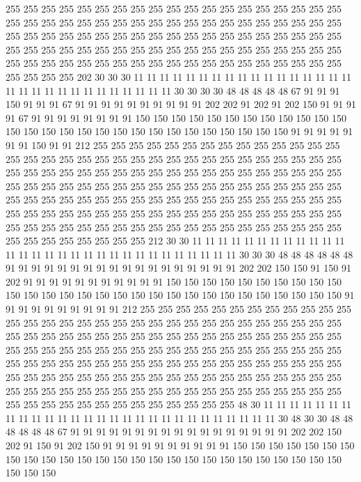 255 255 255 255 255 255 255 255 255 255 255 255 255 255 255 255 255 255 255 255
255 255 255 255 255 255 255 255 255 255 255 255 255 255 255 255 255 255 255 255
255 255 255 255 255 255 255 255 255 255 255 255 255 255 255 255 255 255 255 255
255 255 255 255 255 255 255 255 255 255 255 255 255 255 255 255 255 255 255 255
255 255 255 255 255 255 255 255 255 255 255 255 255 255 255 255 255 255 255 202
30 30 30 11 11 11 11 11 11 11 11 11 11 11 11 11 11 11 11 11
11 11 11 11 11 11 11 11 11 11 11 11 11 30 30 30 30 48 48 48
48 48 67 91 91 91 150 91 91 91 67 91 91 91 91 91 91 91 91 91
91 202 202 91 202 91 202 150 91 91 91 91 67 91 91 91 91 91 91 91
91 150 150 150 150 150 150 150 150 150 150 150 150 150 150 150 150 150 150 150
150 150 150 150 150 150 150 150 150 91 91 91 91 91 91 91 150 91 91 212
255 255 255 255 255 255 255 255 255 255 255 255 255 255 255 255 255 255 255 255
255 255 255 255 255 255 255 255 255 255 255 255 255 255 255 255 255 255 255 255
255 255 255 255 255 255 255 255 255 255 255 255 255 255 255 255 255 255 255 255
255 255 255 255 255 255 255 255 255 255 255 255 255 255 255 255 255 255 255 255
255 255 255 255 255 255 255 255 255 255 255 255 255 255 255 255 255 255 255 255
255 255 255 255 255 255 255 255 255 255 255 255 255 255 255 255 255 255 255 255
255 255 255 255 255 255 255 255 255 255 255 255 255 255 255 255 212 30 30 11
11 11 11 11 11 11 11 11 11 11 11 11 11 11 11 11 11 11 11 11
11 11 11 11 11 11 11 11 11 30 30 30 48 48 48 48 48 48 91 91
91 91 91 91 91 91 91 91 91 91 91 91 91 91 91 91 202 202 150 150
91 150 91 202 91 91 91 91 91 91 91 91 91 91 91 150 150 150 150 150
150 150 150 150 150 150 150 150 150 150 150 150 150 150 150 150 150 150 150 150
150 150 150 150 91 91 91 91 91 91 91 91 91 91 212 255 255 255 255 255
255 255 255 255 255 255 255 255 255 255 255 255 255 255 255 255 255 255 255 255
255 255 255 255 255 255 255 255 255 255 255 255 255 255 255 255 255 255 255 255
255 255 255 255 255 255 255 255 255 255 255 255 255 255 255 255 255 255 255 255
255 255 255 255 255 255 255 255 255 255 255 255 255 255 255 255 255 255 255 255
255 255 255 255 255 255 255 255 255 255 255 255 255 255 255 255 255 255 255 255
255 255 255 255 255 255 255 255 255 255 255 255 255 255 255 255 255 255 255 255
255 255 255 255 255 255 255 255 255 255 255 255 255 255 48 30 11 11 11 11
11 11 11 11 11 11 11 11 11 11 11 11 11 11 11 11 11 11 11 11
11 11 11 11 30 48 30 30 48 48 48 48 48 48 67 91 91 91 91 91
91 91 91 91 91 91 91 91 91 91 91 91 202 202 150 202 91 150 91 202
150 91 91 91 91 91 91 91 91 91 91 150 150 150 150 150 150 150 150 150
150 150 150 150 150 150 150 150 150 150 150 150 150 150 150 150 150 150 150 150
